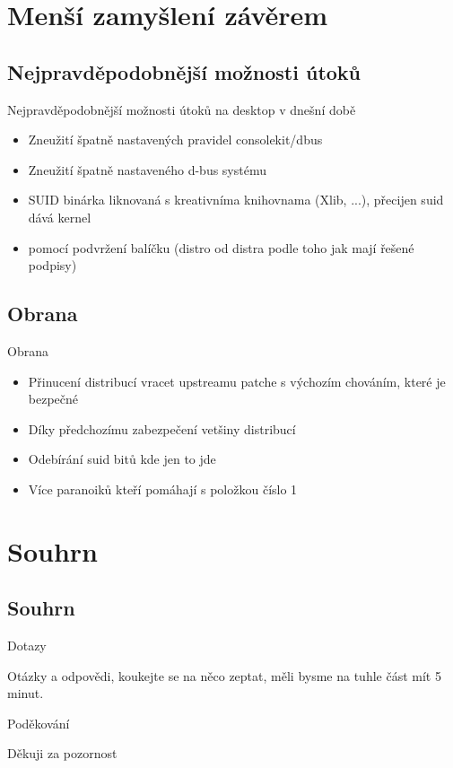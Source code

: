 \documentclass{beamer}
\begin{document}
\section{Menší zamyšlení závěrem}

\subsection{Nejpravděpodobnější možnosti útoků}

\begin{frame}{Nejpravděpodobnější možnosti útoků na desktop v dnešní době}
	\begin{itemize}
		\item Zneužití špatně nastavených pravidel consolekit/dbus
		\item Zneužití špatně nastaveného d-bus systému
		\item SUID binárka liknovaná s kreativníma knihovnama (Xlib, ...), přecijen suid dává kernel
		\item pomocí podvržení balíčku (distro od distra podle toho jak mají řešené podpisy)
	\end{itemize}
\end{frame}

\subsection{Obrana}

\begin{frame}{Obrana}
	\begin{itemize}
		\item Přinucení distribucí vracet upstreamu patche s výchozím chováním, které je bezpečné
		\item Díky předchozímu zabezpečení vetšiny distribucí
		\item Odebírání suid bitů kde jen to jde
		\item Více paranoiků kteří pomáhají s položkou číslo 1
	\end{itemize}
\end{frame}

\section{Souhrn}

\subsection{Souhrn}

\begin{frame}{Dotazy}
	\begin{center}Otázky a odpovědi, koukejte se na něco zeptat, měli bysme na tuhle část mít 5 minut.\end{center}
\end{frame}

\begin{frame}{Poděkování}
	\begin{center}Děkuji za pozornost\end{center}
\end{frame}
\end{document}
